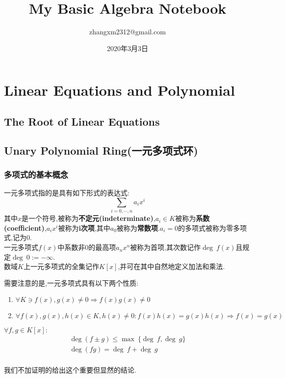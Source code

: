 \documentclass[UTF8,a4paper,notitlepage]{book}
\title{My Basic Algebra Notebook}
\date{2020年3月3日}
\author{zhangxm2312@gmail.com}
\begin{document}
    \maketitle
    \tableofcontents
    \chapter{Linear Equations and Polynomial}
    \section{The Root of Linear Equations}
    \section{Unary Polynomial Ring(一元多项式环)}
    \subsection{多项式的基本概念}
    \begin{definition}
        一元多项式指的是具有如下形式的表达式:
        $$\sum_{i=0,\cdots,n}a_ix^i$$
        其中$x$是一个符号,被称为\textbf{不定元(indeterminate)},$a_i\in K$被称为\textbf{系数(coefficient)},$a_ix^i$被称为\textbf{i次项},其中$a_0$被称为\textbf{常数项}.$a_i=0$的多项式被称为零多项式,记为0.\\ 
        一元多项式$f(x)$中系数非0的最高项$a_nx^n$被称为首项,其次数记作$\deg~f(x)$且规定$\deg~0:=-\infty$.\\ 
        数域$K$上一元多项式的全集记作$K[x]$,并可在其中自然地定义加法和乘法.
    \end{definition}
    需要注意的是,一元多项式具有以下两个性质:
    \begin{property}[]\mbox{}\begin{enumerate}
        \item  $\forall K\ni f(x),g(x)\neq 0\Rightarrow f(x)g(x)\neq 0$
        \item $\forall f(x),g(x),h(x)\in K,h(x)\neq 0:f(x)h(x)=g(x)h(x)\Rightarrow f(x)=g(x)$
    \end{enumerate}\end{property}
    \begin{theorem}[一元多项式的次数公式]
        $\forall f,g\in K[x]:$
        \begin{eqnarray*}
             \deg(f\pm g)\leq \max~\{\deg~f,\deg~g\} \\ 
             \deg(fg)=\deg~f+\deg~g \\ 
        \end{eqnarray*}
    \end{theorem}
    我们不加证明的给出这个重要但显然的结论.
\end{document}
